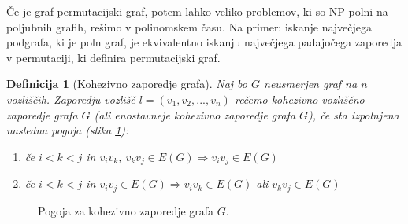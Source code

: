 \documentclass[a4paper, 12pt]{book}
\newtheorem{definicija}{Definicija}[chapter]
\begin{document}
Če je graf permutacijski graf, potem lahko veliko problemov, ki so NP-polni na poljubnih grafih, rešimo v polinomskem času. Na primer: iskanje največjega podgrafa, ki je poln graf, je ekvivalentno iskanju največjega padajočega zaporedja v permutaciji, ki definira permutacijski graf.

\begin{definicija}[Kohezivno zaporedje grafa]
\label{def_kohezivno_zaporedje}
    Naj bo $G$ neusmerjen graf na $n$ vozliščih. 
    Zaporedju vozlišč $l = (v_1, v_2, ..., v_n)$ rečemo kohezivno vozliščno zaporedje grafa $G$ (ali enostavneje kohezivno zaporedje grafa $G$), če sta izpolnjena nasledna pogoja (slika \ref{graf_kohezivno_zaporedje_ab}):
    \begin{enumerate}[label=(\alph*)]
        \item če $i < k < j$ in $v_iv_k$, $v_kv_j \in E(G) \Rightarrow v_iv_j \in E(G)$
        \item če $i < k < j$ in $v_iv_j \in E(G) \Rightarrow v_iv_k \in E(G)$ ali $v_kv_j \in E(G)$
    \end{enumerate}
\end{definicija}

\begin{figure}[h]
    \begin{center}        
    \end{center}
    \caption{Pogoja za kohezivno zaporedje grafa $G$.}
    \label{graf_kohezivno_zaporedje_ab}
\end{figure}
\end{document}
